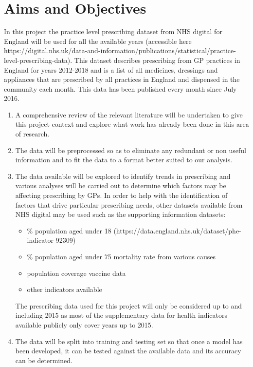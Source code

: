\section{Aims and Objectives}
In this project the practice level prescribing dataset from NHS digital for England will be used for all the available years (accessible here https://digital.nhs.uk/data-and-information/publications/statistical/practice-level-prescribing-data). 
This dataset describes prescribing from GP practices in England for years 2012-2018 and is a list of all medicines, dressings and appliances that are prescribed by all practices in England and dispensed in the community each month. This data has been published every month since July 2016. 
\begin{enumerate}
    \item A comprehensive review of the relevant literature will be undertaken to give this project context and explore what work has already been done in this area of research.
    
    \item The data will be preprocessed so as to eliminate any redundant or non useful information and to fit the data to a format better suited to our analysis.
    
    \item The data available will be explored to identify trends in prescribing and various analyses will be carried out to determine which factors may be affecting prescribing by GPs. In order to help with the identification of factors that drive particular prescribing needs, other datasets available from NHS digital may be used such as the supporting information datasets:
        \begin{itemize}
            \item{\% population aged under 18 (https://data.england.nhs.uk/dataset/phe-indicator-92309)}
            \item{\% population aged under 75 mortality rate from various causes}
            \item {population coverage vaccine data}
            \item other indicators available 
        \end{itemize}

    The prescribing data used for this project will only be considered up to and including 2015 as most of the supplementary data for health indicators available publicly only cover years up to 2015.
    
    \item The data will be split into training and testing set so that once a model has been developed, it can be tested against the available data and its accuracy can be determined.
    

\end{enumerate}
